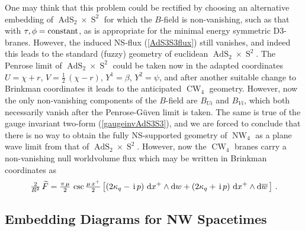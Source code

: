 \documentclass[11pt,a4paper]{article}
\DeclareMathOperator{\AdS}{AdS}
\DeclareMathOperator{\Sphere}{S}
\DeclareMathOperator{\NW}{NW}
\DeclareMathOperator{\CW}{CW}
\let\S\Sphere
\newcommand{\ii}{{\rm i}}
\def\ii{{\,{\rm i}\,}}
\def\dd{{\rm d}}
\newcommand{\beq}{\begin{eqnarray}}
\newcommand{\eeq}{\end{eqnarray}}
\begin{document}
One may think that this problem could be rectified by choosing
an alternative embedding of $\AdS_2\times\S^2$ for which the $B$-field
is non-vanishing, such as that with $\tau,\phi={\rm
  constant}$, as is appropriate for the minimal energy symmetric
D3-branes. However, the induced NS-flux (\ref{AdS3S3flux}) still
vanishes, and indeed this leads to the standard (fuzzy) geometry of
euclidean $\AdS_2\times\S^2$. The Penrose limit of $\AdS_2\times\S^2$ could be
taken now in the adapted coordinates $U=\chi+r$, $V=\frac12\,(\chi-r)$,
$Y^1=\beta$, $Y^2=\psi$, and after another suitable change to
Brinkman coordinates it leads to the anticipated $\CW_4$
geometry. However, now the only non-vanishing components of the
$B$-field are $B_{Ui}$ and $B_{Vi}$, which both necessarily vanish
after the Penrose-G\"uven limit is taken. The same is true of the
gauge invariant two-form (\ref{gaugeinvAdS3S3}), and we are forced to
conclude that there is no way to obtain the fully NS-supported
geometry of $\NW_4$ as a plane wave limit from that of
$\AdS_2\times\S^2$. However, now the $\CW_4$ branes carry a
non-vanishing null worldvolume flux which may be written in Brinkman
coordinates as
\beq
\mbox{$\frac2{R^2}$}\,\widetilde{F}=\mbox{$\frac{\pi\,\mu}2$}\,\csc
\mbox{$\frac{\mu\,x^+}2$}\,\bigl[(2\kappa_q-\ii p)~
\dd x^+\wedge\dd w+(2\kappa_q+\ii p)~\dd x^+\wedge\dd\overline{w}
\,\bigr] \ .
\label{tildefluxalt}\eeq

\subsection{Embedding Diagrams for NW Spacetimes\label{DiagNW}}
\end{document}
